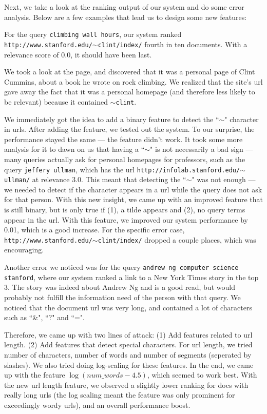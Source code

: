 \documentclass[10pt,twocolumn]{article}
\begin{document}
Next, we take a look at the ranking output of our system and do some error analysis. Below are a few examples that lead us to design some new features:

For the query \texttt{climbing wall hours}, our system ranked \texttt{http://www.stanford.edu/$\sim$clint/index/} fourth in ten documents. With a relevance score of 0.0, it should have been last.

We took a look at the page, and discovered that it was a personal page of Clint Cummins, about a book he wrote on rock climbing. We realized that the site's url gave away the fact that it was a personal homepage (and therefore less likely to be relevant) because it contained \texttt{$\sim$clint}.

We immediately got the idea to add a binary feature to detect the ``$\sim$" character in urls. After adding the feature, we tested out the system. To our surprise, the performance stayed the same --- the feature didn't work. It took some more analysis for it to dawn on us that having a ``$\sim$" is not necessarily a bad sign --- many queries actually ask for personal homepages for professors, such as the query \texttt{jeffery ullman}, which has the url \texttt{http://infolab.stanford.edu/$\sim$ullman/} at relevance 3.0. This meant that detecting the ``$\sim$" was not enough --- we needed to detect if the character appears in a url while the query does not ask for that person. With this new insight, we came up with an improved feature that is still binary, but is only true if (1), a tilde appears and (2), no query terms appear in the url. With this feature, we improved our system performance by 0.01, which is a good increase. For the specific error case, \texttt{http://www.stanford.edu/$\sim$clint/index/} dropped a couple places, which was encouraging. 

Another error we noticed was for the query \texttt{andrew ng computer science stanford}, where our system ranked a link to a New York Times story in the top 3. The story was indeed about Andrew Ng and is a good read, but would probably not fulfill the information need of the person with that query. We noticed that the document url was very long, and contained a lot of characters such as ``\&", ``?" and ``=".

Therefore, we came up with two lines of attack: (1) Add features related to url length. (2) Add features that detect special characters. For url length, we tried number of characters, number of words and number of segments (seperated by slashes). We also tried doing log-scaling for these features. In the end, we came up with the feature $\log{(num\_words-4.5)}$, which seemed to work best. With the new url length feature, we observed a slightly lower ranking for docs with really long urls (the log scaling meant the feature was only prominent for exceedingly wordy urls), and an overall performance boost.
\end{document}
